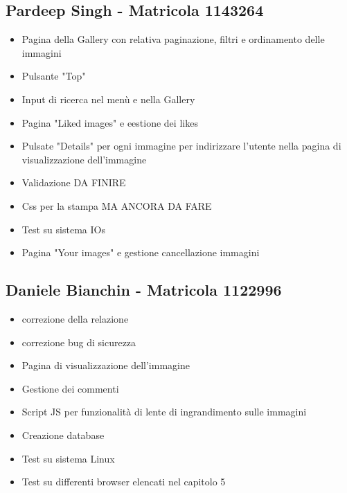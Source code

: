 \documentclass[openany, a4paper, 12pt]{report}
\begin{document}
	\subsection{Pardeep Singh - Matricola 1143264}
	\begin{itemize}
		\item Pagina della Gallery con relativa paginazione, filtri e ordinamento delle immagini
		\item Pulsante "Top"
		\item Input di ricerca nel menù e nella Gallery
		\item Pagina "Liked images" e eestione dei likes
		\item Pulsate "Details" per ogni immagine per indirizzare l'utente nella pagina di visualizzazione dell'immagine 
		\item Validazione DA FINIRE
		\item Css per la stampa MA ANCORA DA FARE
		\item Test su sistema IOs
		\item Pagina "Your images" e gestione cancellazione immagini
	\end{itemize}
	\subsection{Daniele Bianchin - Matricola 1122996}
	\begin{itemize}
		\item correzione della relazione
		\item correzione bug di sicurezza
		\item Pagina di visualizzazione dell'immagine
		\item Gestione dei commenti
		\item Script JS per funzionalità di lente di ingrandimento sulle immagini
		\item Creazione database
		\item Test su sistema Linux
		\item Test su differenti browser elencati nel capitolo 5
	\end{itemize}
\end{document}
